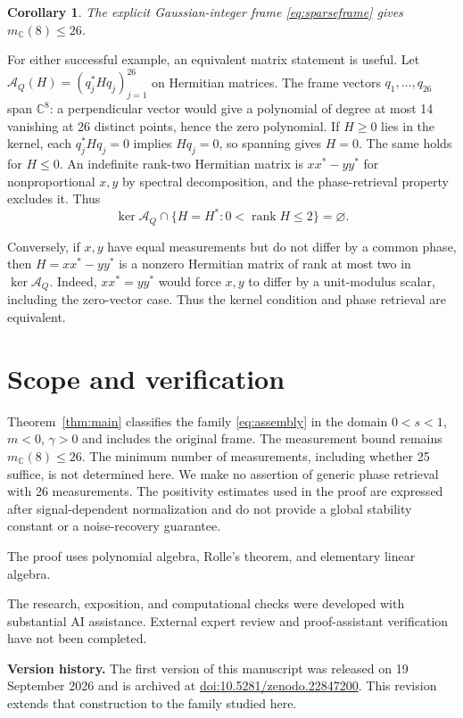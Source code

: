 \documentclass[11pt,a4paper]{article}
\newtheorem{corollary}[theorem]{Corollary}
\newcommand{\CC}{\mathbb C}
\begin{document}
\begin{corollary}
The explicit Gaussian-integer frame \eqref{eq:sparseframe} gives
$m_{\CC}(8)\le26$.
\end{corollary}

For either successful example, an equivalent matrix statement is useful.
Let $\mathcal A_Q(H)=(q_j^*Hq_j)_{j=1}^{26}$ on Hermitian matrices.
The frame vectors $q_1,\ldots,q_{26}$ span $\CC^8$: a perpendicular vector would give a polynomial
of degree at most 14 vanishing at 26 distinct points, hence the zero polynomial.
If $H\ge0$ lies in the kernel, each $q_j^*Hq_j=0$ implies $Hq_j=0$,
so spanning gives $H=0$. The same holds for $H\le0$.
An indefinite rank-two Hermitian matrix is $xx^*-yy^*$ for nonproportional
$x,y$ by spectral decomposition, and the phase-retrieval property excludes it.
Thus
\[
 \ker\mathcal A_Q\cap\{H=H^*:0<\operatorname{rank}H\le2\}=\varnothing.
\]

Conversely, if $x,y$ have equal measurements but do not differ by a
common phase, then $H=xx^*-yy^*$ is a nonzero Hermitian matrix of rank
at most two in $\ker\mathcal A_Q$. Indeed, $xx^*=yy^*$ would force $x,y$
to differ by a unit-modulus scalar, including the zero-vector case.
Thus the kernel condition and phase retrieval are equivalent.

\section{Scope and verification}\label{sec:status}
Theorem~\ref{thm:main} classifies the family \eqref{eq:assembly} in the
domain $0<s<1$, $m<0$, $\gamma>0$ and includes the original frame.
The measurement bound remains $m_{\CC}(8)\le26$. The minimum number of
measurements, including whether 25 suffice, is not determined here.
We make no assertion of generic phase retrieval with 26 measurements.
The positivity estimates used in the proof are expressed after
signal-dependent normalization and do not provide a global stability
constant or a noise-recovery guarantee.

The proof uses polynomial algebra, Rolle's theorem, and elementary linear
algebra.



The research, exposition, and computational checks were developed with
substantial AI assistance. External expert review and proof-assistant
verification have not been completed.

\noindent\textbf{Version history.} The first version of this manuscript was
released on 19 September 2026 and is archived at
\href{https://doi.org/10.5281/zenodo.22847200}{doi:10.5281/zenodo.22847200}.
This revision extends that construction to the family studied here.
\end{document}
